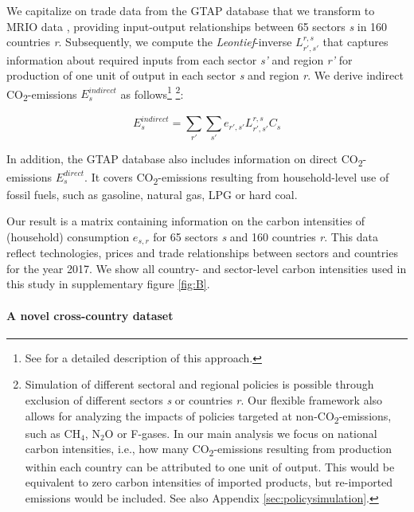 \documentclass[12pt, a4paper]{article}
\begin{document}
We capitalize on trade data from the GTAP database \autocite[Version 11B, ][]{Aguiar.2022} that we transform to MRIO data \autocite{Peters.2011}, providing input-output relationships between 65 sectors \textit{s} in 160 countries \textit{r}. Subsequently, we compute the \textit{Leontief}-inverse $L_{r',s'}^{r,s}$ that captures information about required inputs from each sector \textit{s'} and region \textit{r'} for production of one unit of output in each sector \textit{s} and region \textit{r}. We derive indirect CO\textsubscript{2}-emissions $E_{s}^{indirect}$ as follows\footnote{See \textcite{Missbach.2024, Steckel.2021b,Feindt.2021,VogtSchilb.2019} for a detailed description of this approach.} \footnote{Simulation of different sectoral and regional policies is possible through exclusion of different sectors \textit{s} or countries \textit{r}. Our flexible framework also allows for analyzing the impacts of policies targeted at non-CO\textsubscript{2}-emissions, such as CH$_{4}$, N$_{2}$O or F-gases. In our main analysis we focus on national carbon intensities, i.e., how many CO\textsubscript{2}-emissions resulting from production within each country can be attributed to one unit of output. This would be equivalent to zero carbon intensities of imported products, but re-imported emissions would be included. See also Appendix \ref{sec:policysimulation}.}:

\begin{equation}
    E_{s}^{indirect} = \sum_{r'} \sum_{s'} e_{r',s'} L_{r',s'}^{r,s} C_{s}
\end{equation}

In addition, the GTAP database also includes information on direct CO\textsubscript{2}-emissions $E_{s}^{direct}$. It covers CO\textsubscript{2}-emissions resulting from household-level use of fossil fuels, such as gasoline, natural gas, LPG or hard coal.

Our result is a matrix containing information on the carbon intensities of (household) consumption $e_{s,r}$ for 65 sectors \textit{s} and 160 countries \textit{r}. This data reflect technologies, prices and trade relationships between sectors and countries for the year 2017. We show all country- and sector-level carbon intensities used in this study in supplementary figure \ref{fig:B}.

\paragraph{A novel cross-country dataset} 
\end{document}

